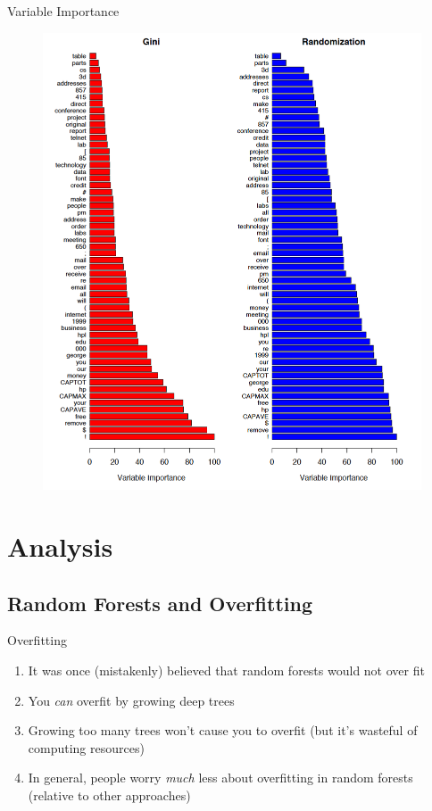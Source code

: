 \documentclass[pdf]{beamer}
\begin{document}
		\begin{frame}{Variable Importance}
			\begin{figure}
				\includegraphics[scale = 0.2]{variable_importance.png}
			\end{figure}		
    		\end{frame}
		





\section{Analysis}

	\subsection{Random Forests and Overfitting}
	
		\begin{frame}{Overfitting}
			\begin{enumerate}
				\item It was once (mistakenly) believed that random forests would not over fit
				\item You \textit{can} overfit by growing deep trees
				\item Growing too many trees won't cause you to overfit (but it's wasteful of computing resources)
				\item In general, people worry \textit{much} less about overfitting in random forests (relative to other approaches)
			\end{enumerate}
		\end{frame}
		
\end{document}
